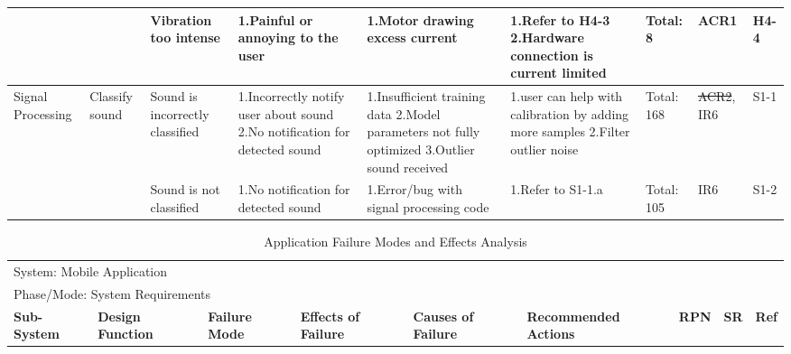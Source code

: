\documentclass[12pt, titlepage]{article}
\begin{document}
\begin{landscape}
\begin{table}[H]
\begin{tabular}{| p{} | p{}  | p{} | p{} | p{} | p{} | p{} | p{} | p{} |}
         & & Vibration too intense & 1.Painful or annoying to the user & 1.Motor drawing excess current & 1.Refer to H4-3 \newline 2.Hardware connection is current limited & Total: 8 & ACR1 & H4-4 \\ \hline
     
         Signal Processing & Classify sound & Sound is incorrectly classified & 1.Incorrectly notify user about sound \newline 2.No notification for detected sound & 1.Insufficient training data \newline 2.Model parameters not fully optimized \newline 3.Outlier sound received  & 1.user can help with calibration by adding more samples \newline 2.Filter outlier noise  & Total: 168 & \sout{ACR2}, IR6 & S1-1 \\ \cline{3-9}
    
     & & Sound is not classified & 1.No notification for detected sound & 1.Error/bug with signal processing code & 1.Refer to S1-1.a & Total: 105 & IR6 & S1-2 \\ \hline

        
        \end{tabular}

\end{table}



\begin{table}[H]

    \caption{Application Failure Modes and Effects Analysis}	
    \centering
    \begin{tabular}{| p{} | p{}  | p{} | p{} | p{} | p{} | p{} | p{} | p{} |}
        \hline
    
    \multicolumn{9}{|l|}{System: Mobile Application } \\
    \multicolumn{9}{|l|}{Phase/Mode: System Requirements} \\ \hline
    \textbf{Sub-System} & \textbf{Design Function} & \textbf{Failure Mode} & \textbf{Effects of Failure} & \textbf{Causes of Failure} & \textbf{Recommended Actions} & \textbf{RPN} & \textbf{SR} & \textbf{Ref} \\ \hline


\end{tabular}
\end{table}
\end{landscape}
\end{document}

